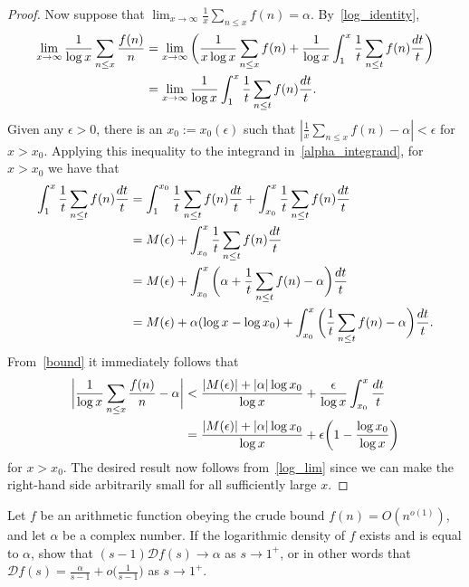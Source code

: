 \documentclass[11pt]{article}
\newenvironment{ex}[1]
  {\renewcommand\theinnercustomthm{#1}\innercustomthm}
  {\endinnercustomthm}
\begin{document}
\begin{proof}
Now suppose that $\lim_{x\to\infty}\frac{1}{x}\sum_{n\leq x}f(n) = \alpha$. By~\eqref{log_identity},
\begin{align}
\lim_{x\to\infty}\frac{1}{\log{x}}\sum_{n\leq x}\frac{f(n)}{n} &= \lim_{x\to\infty}\bigg(\frac{1}{x\log{x}}\sum_{n\leq x}f(n)+\frac{1}{\log{x}}\int_1^x\frac{1}{t}\sum_{n\leq t}f(n)\frac{dt}{t}\bigg)\notag\\
&= \lim_{x\to\infty}\frac{1}{\log{x}}\int_1^x\frac{1}{t}\sum_{n\leq t}f(n)\frac{dt}{t}.\label{alpha_integrand}
\end{align}
Given any $\epsilon >0$, there is an $x_0:=x_0(\epsilon)$ such that $|\frac{1}{x}\sum_{n\leq x}f(n)-\alpha|<\epsilon$ for $x>x_0$. Applying this inequality to the integrand in~\eqref{alpha_integrand}, for $x>x_0$ we have that
\begin{align}
\int_1^x\frac{1}{t}\sum_{n\leq t}f(n)\frac{dt}{t} &= \int_1^{x_0}\frac{1}{t}\sum_{n\leq t}f(n)\frac{dt}{t}+\int_{x_0}^x\frac{1}{t}\sum_{n\leq t}f(n)\frac{dt}{t}\notag\\
&= M(\epsilon)+\int_{x_0}^x\frac{1}{t}\sum_{n\leq t}f(n)\frac{dt}{t}\notag\\
&= M(\epsilon)+\int_{x_0}^x\bigg(\alpha+\frac{1}{t}\sum_{n\leq t}f(n)-\alpha\bigg)\frac{dt}{t}\notag\\
&= M(\epsilon)+\alpha(\log{x}-\log{x_0})+\int_{x_0}^x\bigg(\frac{1}{t}\sum_{n\leq t}f(n)-\alpha\bigg)\frac{dt}{t}.\label{bound}
\end{align}
From~\eqref{bound} it immediately follows that
\begin{align}
\bigg|\frac{1}{\log{x}}\sum_{n\leq x}\frac{f(n)}{n}-\alpha\bigg| &< \frac{|M(\epsilon)|+|\alpha|\log{x_0}}{\log{x}}+\frac{\epsilon}{\log{x}}\int_{x_0}^x\frac{dt}{t}\notag\\
&= \frac{|M(\epsilon)|+|\alpha|\log{x_0}}{\log{x}}+\epsilon\bigg(1-\frac{\log{x_0}}{\log{x}}\bigg)\label{log_lim}
\end{align}
for $x>x_0$. The desired result now follows from~\eqref{log_lim} since we can make the right-hand side arbitrarily small for all sufficiently large $x$.
\end{proof}

\begin{ex}{8}\label{eight}
Let $f$ be an arithmetic function obeying the crude bound $f(n) = O(n^{o(1)})$, and let $\alpha$ be a complex number. If the logarithmic density of $f$ exists and is equal to $\alpha$, show that $(s-1)\mathcal{D}f(s)\to\alpha$ as $s\to 1^+$, or in other words that $\mathcal{D}f(s)=\frac{\alpha}{s-1}+o\big(\frac{1}{s-1}\big)$ as $s\to 1^+$.
\end{ex}
\end{document}
